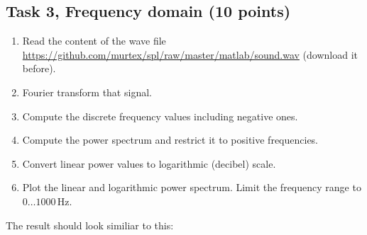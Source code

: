 \subsection*{Task 3, Frequency domain \textnormal{(10 points)}}
\begin{enumerate}
	\item Read the content of the wave file \url{https://github.com/murtex/spl/raw/master/matlab/sound.wav} (download it before).
	\item Fourier transform that signal.
	\item Compute the discrete frequency values including negative ones.
	\item Compute the power spectrum and restrict it to positive frequencies.
	\item Convert linear power values to logarithmic (decibel) scale.
	\item Plot the linear and logarithmic power spectrum. Limit the frequency range to $0\ldots1000\,\textrm{Hz}$.
\end{enumerate}

The result should look similiar to this:
\begin{figure}[!h]
	\centering
	\begin{subfigure}[c]{0.48\linewidth}
	\end{subfigure}
	\hspace{0.01\linewidth}
	\begin{subfigure}[c]{0.48\linewidth}
	\end{subfigure}
\end{figure}

